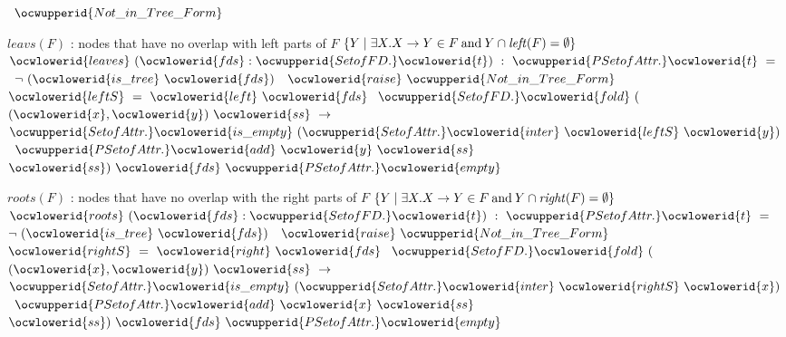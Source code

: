 \documentclass[12pt]{article}
\begin{document}
\label{rellens.ml:11351}%
\ocwindent{0.00em}
~$\ocwupperid{Not\_in\_Tree\_Form}$\medskip

\ocwendcode{}\ocwindent{0.00em}
$leavs(F)$ : nodes that have no overlap with left parts of $F$ 
\ocweol
\ocwindent{0.00em}
$\{ Y \mid \exists X.X\to Y\in F \mathbin{\text{and}} Y \cap \mathit{left}(F)=\emptyset \}$ 
\ocweol
\label{rellens.ml:11542}%
\medskip
\ocwbegincode{}\ocwindent{0.00em}
~$\ocwlowerid{leaves}~(\ocwlowerid{fds}:\ocwupperid{SetofFD.}\ocwlowerid{t})~:~\ocwupperid{PSetofAttr.}\ocwlowerid{t}~=$\ocweol
\ocwindent{1.50em}
~$\lnot{}~(\ocwlowerid{is\_tree}~\ocwlowerid{fds})~$~$\ocwlowerid{raise}~\ocwupperid{Not\_in\_Tree\_Form}~$\ocweol
\ocwindent{1.50em}
~$\ocwlowerid{leftS}~=~\ocwlowerid{left}~\ocwlowerid{fds}~$\ocweol
\ocwindent{1.50em}
$\ocwupperid{SetofFD.}\ocwlowerid{fold}~($~$(\ocwlowerid{x},\ocwlowerid{y})~\ocwlowerid{ss}~\rightarrow{}$\ocweol
\ocwindent{2.50em}
~$\ocwupperid{SetofAttr.}\ocwlowerid{is\_empty}~(\ocwupperid{SetofAttr.}\ocwlowerid{inter}~\ocwlowerid{leftS}~\ocwlowerid{y})~$\ocweol
\ocwindent{2.50em}
~$\ocwupperid{PSetofAttr.}\ocwlowerid{add}~\ocwlowerid{y}~\ocwlowerid{ss}~$\ocweol
\ocwindent{4.50em}
~$\ocwlowerid{ss})~\ocwlowerid{fds}~\ocwupperid{PSetofAttr.}\ocwlowerid{empty}$\medskip

\ocwendcode{}\ocwindent{0.00em}
$roots(F)$ : nodes that have no overlap with the right parts of $F$ 
\ocweol
\ocwindent{0.00em}
$\{ Y \mid \exists X.X\to Y\in F \mathbin{\text{and}} Y \cap \mathit{right}(F)=\emptyset \}$ 
\ocweol
\label{rellens.ml:11990}%
\medskip
\ocwbegincode{}\ocwindent{0.00em}
~$\ocwlowerid{roots}~(\ocwlowerid{fds}:\ocwupperid{SetofFD.}\ocwlowerid{t})~:~\ocwupperid{PSetofAttr.}\ocwlowerid{t}~=$\ocweol
\ocwindent{1.50em}
~$\lnot{}~(\ocwlowerid{is\_tree}~\ocwlowerid{fds})~$~$\ocwlowerid{raise}~\ocwupperid{Not\_in\_Tree\_Form}~$\ocweol
\ocwindent{1.50em}
~$\ocwlowerid{rightS}~=~\ocwlowerid{right}~\ocwlowerid{fds}~$\ocweol
\ocwindent{1.50em}
$\ocwupperid{SetofFD.}\ocwlowerid{fold}~($~$(\ocwlowerid{x},\ocwlowerid{y})~\ocwlowerid{ss}~\rightarrow{}$\ocweol
\ocwindent{2.50em}
~$\ocwupperid{SetofAttr.}\ocwlowerid{is\_empty}~(\ocwupperid{SetofAttr.}\ocwlowerid{inter}~\ocwlowerid{rightS}~\ocwlowerid{x})~$\ocweol
\ocwindent{2.50em}
~$\ocwupperid{PSetofAttr.}\ocwlowerid{add}~\ocwlowerid{x}~\ocwlowerid{ss}~$\ocweol
\ocwindent{4.50em}
~$\ocwlowerid{ss})~\ocwlowerid{fds}~\ocwupperid{PSetofAttr.}\ocwlowerid{empty}$\medskip
\end{document}
